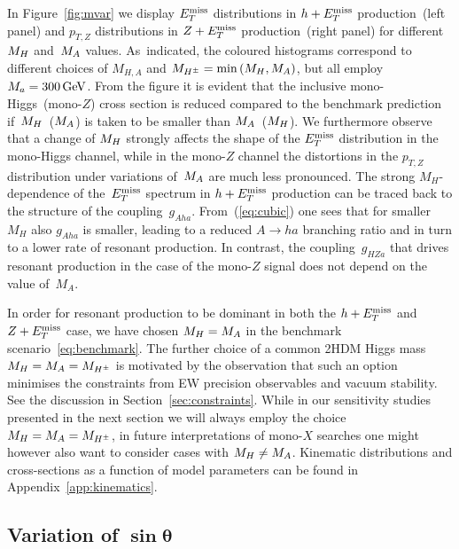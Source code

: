 In Figure~\ref{fig:mvar} we display $E_T^\mathrm{miss}$ distributions in $h + E_T^\mathrm{miss}$ production~(left panel) and $p_{T,Z}$ distributions in $Z+E_T^\mathrm{miss}$ production~(right panel) for different~$M_{H}$ and~$M_{A}$ values. As~indicated, the coloured histograms correspond to  different choices of $M_{H,A}$ and $M_{H^{\pm}} = {\rm min} \left ( M_{H}, M_{A} \right )$, but all employ $M_a = 300 \, {\rm GeV}$. From the figure it is evident that the inclusive mono-Higgs~(mono-$Z$) cross section is reduced compared to the benchmark prediction if~$M_{H}$~($M_{A}$) is taken to be smaller than $M_{A}$~($M_{H}$). 
We furthermore observe that  a change of $M_{H}$ strongly affects the shape of the $E_T^\mathrm{miss}$ distribution in the mono-Higgs channel, while in the mono-$Z$ channel the distortions in the $p_{T,Z}$ distribution under variations of~$M_{A}$ are much less pronounced. The strong $M_H$-dependence of the~$E_T^\mathrm{miss}$ spectrum in $h + E_T^\mathrm{miss}$ production can be traced back to the structure of the coupling~$g_{Aha}$. From~(\ref{eq:cubic}) one sees that for smaller~$M_H$ also $g_{Aha}$ is smaller, leading to a reduced $A \to ha$ branching ratio  and in turn to a lower rate of resonant production. In contrast, the coupling~$g_{HZa}$ that drives resonant production in the case of the mono-$Z$ signal does not depend on the value of~$M_A$. 

In order for resonant production to be dominant in both the $h + E_T^\mathrm{miss}$ and $Z + E_T^\mathrm{miss}$ case, we have chosen $M_{H} = M_{A}$ in the benchmark scenario~\eqref{eq:benchmark}. The further choice of a common 2HDM Higgs mass $M_{H} = M_{A} = M_{H^{\pm}}$ is motivated by the observation that such an option minimises the constraints from EW precision observables and vacuum stability. See the discussion in Section~\ref{sec:constraints}. While in our sensitivity studies presented in the next section we will always employ the choice $M_{H} = M_{A} = M_{H^{\pm}}$, in future \hdma  interpretations of mono-$X$ searches one might however  also want to consider cases with $M_{H} \neq M_{A}$. Kinematic distributions and cross-sections as a function of model parameters can be found in Appendix~\ref{app:kinematics}. 

\subsection*{Variation of $\bm{\sin \theta}$}

